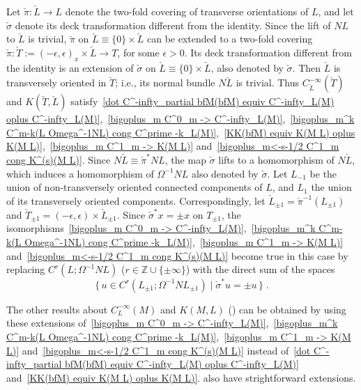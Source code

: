 \documentclass{memo-l}
\theoremstyle{plain}
\theoremstyle{definition}
\theoremstyle{remark}
\newcommand{\Z}{\mathbb{Z}}
\numberwithin{section}{chapter}
\numberwithin{equation}{section}%
\begin{document}
Let $\check\pi:\check L\to L$ \index{$\check\pi$}  denote the two-fold covering of transverse orientations of $L$, and let $\check\sigma$ \index{$\check\sigma$} denote its deck transformation different from the identity. Since the lift of $NL$ to $\check L$ is trivial, $\check\pi$ on $\check L\equiv\{0\}\times\check L$ can be extended to a two-fold covering $\check\pi:\check T:=(-\epsilon,\epsilon)_x\times\check L\to T$,  for some $\epsilon>0$. Its deck transformation different from the identity is an extension of $\check\sigma$ on $\check L\equiv\{0\}\times\check L$, also denoted by $\check\sigma$. Then $\check L$ is transversely oriented in $\check T$; i.e., its normal bundle $N\check L$ is trivial. Thus $C^{-\infty}_{\check L}(\check T)$ and $K(\check T,\check L)$ satisfy~\eqref{dot C^-infty_partial bfM(bfM) equiv C^-infty_L(M) oplus C^-infty_L(M)},~\eqref{bigoplus_m C^0_m -> C^-infty_L(M)},~\eqref{bigoplus_m^k C^m-k(L Omega^-1NL) cong C^prime -k_L(M)},~\eqref{KK(bfM) equiv K(M L) oplus K(M L)},~\eqref{bigoplus_m C^1_m -> K(M L)} and~\eqref{bigoplus_m<-s-1/2 C^1_m cong K^(s)(M L)}. Since $N\check L\equiv\check\pi^*NL$, the map $\check\sigma$ lifts to a homomorphism of $N\check L$, which induces a homomorphism of $\Omega^{-1}NL$ also denoted by $\check\sigma$. Let $L_{-1}$ be the union of non-transversely oriented connected components of $L$, and $L_1$ the union of its transversely oriented components. Correspondingly, let $\check L_{\pm1}=\check\pi^{-1}(L_{\pm1})$ and $\check T_{\pm1}=(-\epsilon,\epsilon)\times\check L_{\pm1}$. Since $\check\sigma^*x=\pm x$ on $T_{\pm1}$, the isomorphisms~\eqref{bigoplus_m C^0_m -> C^-infty_L(M)},~\eqref{bigoplus_m^k C^m-k(L Omega^-1NL) cong C^prime -k_L(M)},~\eqref{bigoplus_m C^1_m -> K(M L)} and~\eqref{bigoplus_m<-s-1/2 C^1_m cong K^(s)(M L)} become true in this case by replacing $C^r(L;\Omega^{-1}NL)$ ($r\in\Z\cup\{\pm\infty\}$) with the direct sum of the spaces
\[
\{\,u\in C^r(L_{\pm1};\Omega^{-1}NL_{\pm1})\mid\check\sigma^*u=\pm u\,\}\;.
\]

The other results about $C^{-\infty}_L(M)$ and $K(M,L)$ () can be obtained by using these extensions of~\eqref{bigoplus_m C^0_m -> C^-infty_L(M)},~\eqref{bigoplus_m^k C^m-k(L Omega^-1NL) cong C^prime -k_L(M)},~\eqref{bigoplus_m C^1_m -> K(M L)} and~\eqref{bigoplus_m<-s-1/2 C^1_m cong K^(s)(M L)} instead of~\eqref{dot C^-infty_partial bfM(bfM) equiv C^-infty_L(M) oplus C^-infty_L(M)} and~\eqref{KK(bfM) equiv K(M L) oplus K(M L)}.  also have strightforward extensions.
\end{document}
